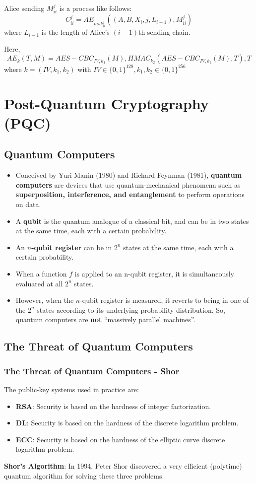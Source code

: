 \documentclass[12pt,titlepage]{article}
\let\stdsection\section
\renewcommand\section{\clearpage\stdsection}
\begin{document}
Alice sending $M_{ii}^j$ is a process like follows: $$C_{ii}^j = AE_{msk_{ii}^j} ((A, B, X_i, j, L_{i-1}), M_{ii}^j)$$ where $L_{i-1}$ is the length of Alice’s $(i - 1)$th sending chain.

Here, $$AE_k(T, M) = AES-CBC_{IV, k_1} (M), HMAC_{k_2} (AES-CBC_{IV,k_1} (M), T), T$$ where $k = (IV, k_1, k_2)$ with $IV \in \{0,1\}^{128}, k_1, k_2 \in \{0,1\}^{256}$

\section{Post-Quantum Cryptography (PQC)}
\subsection{Quantum Computers}
\begin{itemize}
	\item Conceived by Yuri Manin (1980) and Richard Feynman (1981), \textbf{quantum computers} are devices that use quantum-mechanical phenomena such as \textbf{superposition, interference, and entanglement} to perform operations on data.
	\item A \textbf{qubit} is the quantum analogue of a classical bit, and can be in two states at the same time, each with a certain probability.
	\item An \textbf{$n$-qubit register} can be in $2^n$ states at the same time, each with a certain probability.
	\item When a function $f$ is applied to an n-qubit register, it is simultaneously evaluated at all $2^n$ states.
	\item However, when the $n$-qubit register is measured, it reverts to being in one of the $2^n$ states according to its underlying probability distribution. So, quantum computers are \textbf{not} ``massively parallel machines''.
\end{itemize}
\subsection{The Threat of Quantum Computers}
\subsubsection{The Threat of Quantum Computers - Shor}
The public-key systems used in practice are:\begin{itemize}
	\item \textbf{RSA}: Security is based on the hardness of integer factorization.
	\item \textbf{DL}: Security is based on the hardness of the discrete logarithm problem.
	\item \textbf{ECC}: Security is based on the hardness of the elliptic curve discrete logarithm problem.
\end{itemize}
\textbf{Shor’s Algorithm}: In 1994, Peter Shor discovered a very efficient (polytime) quantum algorithm for solving these three problems.
\end{document}
